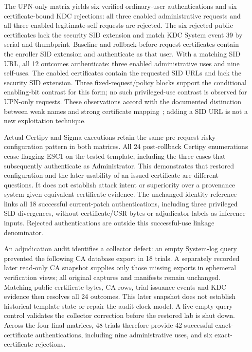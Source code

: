 The UPN-only matrix yields six verified ordinary-user authentications and six certificate-bound KDC rejections: all three enabled administrative requests and all three enabled legitimate-self requests are rejected. The six rejected public certificates lack the security SID extension and match KDC System event 39 by serial and thumbprint. Baseline and rollback-before-request certificates contain the enroller SID extension and authenticate as that user. With a matching SID URL, all 12 outcomes authenticate: three enabled administrative uses and nine self-uses. The enabled certificates contain the requested SID URLs and lack the security SID extension. Three fixed-request/policy blocks support the conditional enabling-bit contrast for this form; no such privileged-use contrast is observed for UPN-only requests. These observations accord with the documented distinction between weak names and strong certificate mapping~\cite{microsoft2025strongbinding,microsoft2025pkcasid}; adding a SID URL is not a new exploitation technique.

Actual Certipy and Sigma executions retain the same pre-request risky-configuration pattern in both matrices. All 24 post-rollback Certipy enumerations cease flagging ESC1 on the tested template, including the three cases that subsequently authenticate as Administrator. This demonstrates that restored configuration and the later usability of an issued certificate are different questions. It does not establish attack intent or superiority over a provenance system given equivalent certificate evidence. The unchanged identity reference links all 18 successful current-patch authentications, including three privileged SID divergences, without certificate/CSR bytes or adjudicator labels as inference inputs. Rejected authentications are outside this successful-use linkage denominator.

An adjudication audit identifies a collector defect: an empty System-log query prevented the following CA database export in 18 trials. A separately recorded later read-only CA snapshot supplies only those missing exports in ephemeral verification views; all original captures and manifests remain unchanged. Matching public certificate bytes, CA rows, trial issuance events and KDC evidence then resolves all 24 outcomes. This later snapshot does not establish historical template state or repair the audit-clock model. A live empty-query control validates the collector correction before the restored lab is shut down. Across the four final matrices, 48 trials therefore provide 42 successful exact-certificate authentications, including nine administrative uses, and six exact-certificate rejections.

